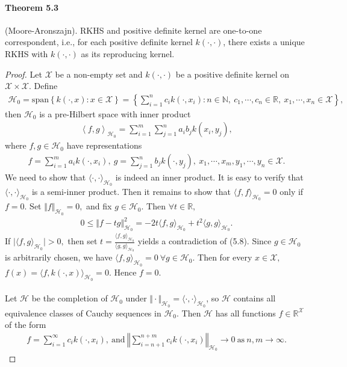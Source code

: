 \documentclass{article}
\begin{document}
\paragraph{Theorem 5.3} (Moore-Aronszajn). RKHS and positive definite kernel are one-to-one correspondent, i.e., for each positive definite kernel $k(\cdot,\cdot)$, there exists a unique RKHS with $k(\cdot,\cdot)$ as its reproducing kernel.
\begin{proof}
Let $\mathcal{X}$ be a non-empty set and $k(\cdot,\cdot)$ be a positive definite kernel on $\mathcal{X}\times\mathcal{X}$. Define
\begin{align*}
	\mathcal{H}_ 0 = \mathrm{span} \left\lbrace k(\cdot, x): x\in\mathcal{X}\right\rbrace = \left\lbrace\sum_{i=1}^n c_i k(\cdot,x_i): n\in\mathbb{N},\ c_1,\cdots,c_n\in\mathbb{R},\ x_1,\cdots,x_n\in\mathcal{X}\right\rbrace,\tag{5.5}
\end{align*}
then $\mathcal{H}_0$ is a pre-Hilbert space with inner product
\begin{align*}
	\left\langle f,g \right\rangle_{\mathcal{H}_0} = \sum_{i=1}^m\sum_{j=1}^n a_i b_j k(x_i, y_j),\tag{5.6}
\end{align*}
where $f,g\in\mathcal{H}_0$ have representations
\begin{align*}
	f=\sum_{i=1}^m a_i k(\cdot, x_i),\ g=\sum_{j=1}^n b_j k(\cdot, y_j),\ x_1,\cdots,x_m,y_1,\cdots,y_n\in\mathcal{X}.\tag{5.7}
\end{align*}
We need to show that $\langle\cdot,\cdot\rangle_{\mathcal{H}_0}$ is indeed an inner product. It is easy to verify that $\langle\cdot,\cdot\rangle_{\mathcal{H}_0}$ is a semi-inner product. Then it remains to show that $\langle f,f\rangle_{\mathcal{H}_0}=0$ only if $f=0.$ Set $\Vert f\Vert_{\mathcal{H}_0}=0,$ and fix $g\in\mathcal{H}_0$. Then $\forall t\in\mathbb{R},$
\begin{align*}
	0\leq \Vert f-tg\Vert_{\mathcal{H}_0}^2 = -2t\langle f,g\rangle_{\mathcal{H}_0} + t^2\langle g,g\rangle_{\mathcal{H}_0}.\tag{5.8}
\end{align*}
If $\vert\langle f,g\rangle_{\mathcal{H}_0}\vert > 0,$ then set $t=\frac{\langle f,g\rangle_{\mathcal{H}_0}}{\langle g,g\rangle_{\mathcal{H}_0}}$ yields a contradiction of (5.8). Since $g\in\mathcal{H}_0$ is arbitrarily chosen, we have $\langle f,g\rangle_{\mathcal{H}_0}=0\ \forall g\in\mathcal{H}_0.$ Then for every $x\in\mathcal{X},$ $f(x)=\langle f,k(\cdot,x)\rangle_{\mathcal{H}_0} = 0.$ Hence $f=0.$

\paragraph{} Let $\mathcal{H}$ be the completion of $\mathcal{H}_0$ under $\Vert\cdot\Vert _{\mathcal{H}_0} = \langle\cdot,\cdot\rangle _{\mathcal{H}_0}$, so $\mathcal{H}$ contains all equivalence classes of Cauchy sequences in $\mathcal{H}_0$. Then $\mathcal{H}$ has all functions $f\in\mathbb{R}^\mathcal{X}$ of the form
\begin{align*}
	f=\sum_{i=1}^\infty {c_i}k(\cdot,x_i),\ \text{and}\ \left\Vert\sum_{i=n+1}^{n+m} c_ik(\cdot, x_i)\right\Vert _{\mathcal{H}_0} \to 0\ \text{as}\ n,m\to\infty.\tag{5.9}
\end{align*}


\end{proof}
\end{document}
